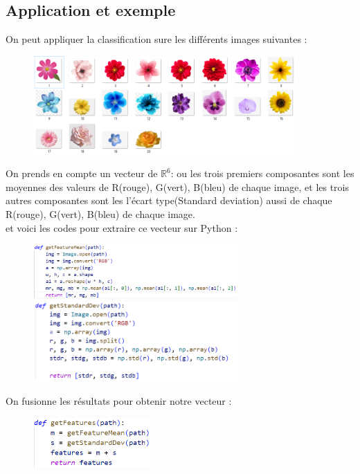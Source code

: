 \documentclass[a4paper,12pt]{report}
\begin{document}
\subsection*{Application et exemple }
On peut appliquer la classification sure les différents images suivantes :
\begin{figure}[ht]
    \centering
    \includegraphics[width=0.9\textwidth]{dataset.PNG}
    \label{fig:dataSet}
\end{figure}

On prends en compte un vecteur de $\mathbb{R}^6$: ou les trois premiers composantes sont les moyennes des valeurs de R(rouge), G(vert), B(bleu) de chaque image, et les trois autres composantes sont les l’écart type(Standard deviation) aussi de chaque R(rouge), G(vert), B(bleu) de chaque image.\\
et voici les codes pour extraire ce vecteur sur Python :

\begin{figure}
    \includegraphics[width=0.7\textwidth]{mean.PNG}
    \includegraphics[width=0.7\textwidth]{stdr.PNG}
\end{figure}

On fusionne les résultats pour obtenir notre vecteur :
\begin{figure}[ht]
    \includegraphics[width=0.4\textwidth]{fusione.PNG}
\end{figure}
\end{document}

